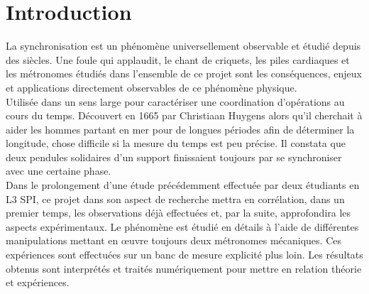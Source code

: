 \documentclass[a4paper,11pt]{report}
\begin{document}
\maketitle %
\newpage
{} \setcounter{page}{1} %
\newpage
\null
\thispagestyle{empty}
\newpage
{\tableofcontents}
\listoffigures
\newpage
\chapter*{Introduction}
 \setcounter{page}{1} %
	La synchronisation est un phénomène universellement observable et étudié depuis des siècles. Une foule qui applaudit, le chant de criquets, les piles cardiaques et les métronomes étudiés dans l'ensemble de ce projet sont les conséquences, enjeux et applications directement observables de ce phénomène physique.\\

	Utilisée dans un sens large pour caractériser une coordination d'opérations au cours du temps. Découvert en 1665 par Christiaan Huygens alors qu'il cherchait à aider les hommes partant en mer pour de longues périodes afin de déterminer la longitude, chose difficile si la mesure du temps est peu précise. Il constata que deux pendules solidaires d'un support finissaient toujours par se synchroniser avec une certaine phase.\\

	Dans le prolongement d'une étude précédemment effectuée par deux étudiants en L3 SPI, ce projet dans son aspect de recherche mettra en corrélation, dans un premier temps, les observations déjà effectuées et, par la suite, approfondira les aspects expérimentaux. Le phénomène est étudié en détails à l'aide de différentes manipulations mettant en œuvre toujours deux métronomes mécaniques. Ces expériences sont effectuées sur un banc de mesure explicité plus loin. Les résultats obtenus sont interprétés et traités numériquement pour mettre en relation théorie et expériences.
\end{document}
